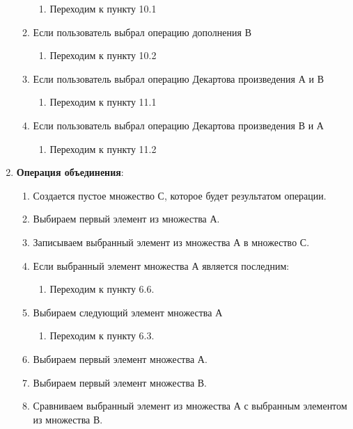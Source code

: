 \documentclass[a4paper,12pt]{extarticle}
\begin{document}
\begin{enumerate}
\begin{enumerate}[label*=\arabic*.]
    \begin{enumerate}[label*=\arabic*.]
      \item Переходим к пункту 10.1
    \end{enumerate}
    \item Если пользователь выбрал операцию дополнения В
    \begin{enumerate}[label*=\arabic*.]
      \item Переходим к пункту 10.2
    \end{enumerate}
    \item Если пользователь выбрал операцию Декартова произведения А и В
    \begin{enumerate}[label*=\arabic*.]
      \item Переходим к пункту 11.1
    \end{enumerate}
    \item Если пользователь выбрал операцию Декартова произведения В и А
    \begin{enumerate}[label*=\arabic*.]
      \item Переходим к пункту 11.2
    \end{enumerate}
  \end{enumerate}
  \item \textbf{Операция объединения}:
  \begin{enumerate}[label*=\arabic*.]
    \item Создается пустое множество С, которое будет результатом операции.
    \item Выбираем первый элемент из множества А.
    \item Записываем выбранный элемент из множества А в множество С.
    \item Если выбранный элемент множества А является последним:
    \begin{enumerate}[label*=\arabic*.]
      \item Переходим к пункту 6.6.
    \end{enumerate}
    \item Выбираем следующий элемент множества А
    \begin{enumerate}[label*=\arabic*.]
      \item Переходим к пункту 6.3.
    \end{enumerate}
    \item Выбираем первый элемент множества А.
    \item Выбираем первый элемент множества В.
    \item Сравниваем выбранный элемент из множества А с выбранным элементом из множества В.

\end{enumerate}
\end{enumerate}
\end{document}
